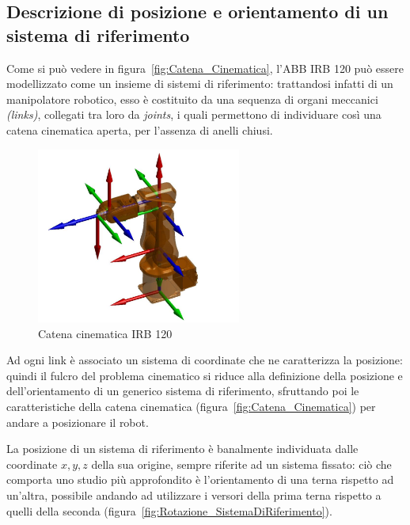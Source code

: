 \subsection{Descrizione di posizione e orientamento di un sistema di riferimento}
Come si può vedere in figura~\vref{fig:Catena_Cinematica}, l'ABB IRB 120 può essere modellizzato come un insieme di sistemi di riferimento: trattandosi infatti di un manipolatore robotico, esso è costituito da una sequenza di organi meccanici \emph{(links)}, collegati tra loro da \emph{joints}, i quali permettono di individuare così una catena cinematica aperta, per l'assenza di anelli chiusi.
\begin{figure}[h]
	\centering
	\includegraphics[width=0.6\textwidth]{Immagini/CatenaCinematica}
	\caption{Catena cinematica IRB 120}
	\label{fig:Catena_Cinematica}
\end{figure}

Ad ogni link è associato un sistema di coordinate che ne caratterizza la posizione: quindi il fulcro del problema cinematico si riduce alla definizione della posizione e dell'orientamento di un generico sistema di riferimento, sfruttando poi le caratteristiche della catena cinematica (figura~\vref{fig:Catena_Cinematica}) per andare a posizionare il robot.

La posizione di un sistema di riferimento è banalmente individuata dalle coordinate $x,y,z$ della sua origine, sempre riferite ad un sistema fissato: ciò che comporta uno studio più approfondito è l'orientamento di una terna rispetto ad un'altra, possibile andando ad utilizzare i versori della prima terna rispetto a quelli della seconda (figura~\vref{fig:Rotazione_SistemaDiRiferimento}).
\newpage
